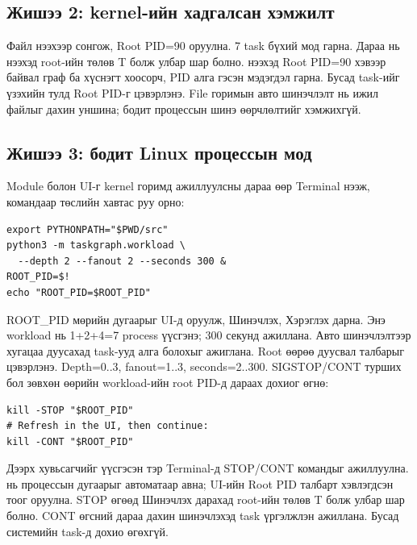 \subsection{Жишээ 2: kernel-ийн хадгалсан хэмжилт}
Файл нээхээр  сонгож, Root PID=90 оруулна. 7 task бүхий мод гарна. Дараа нь  нээхэд root-ийн төлөв T болж улбар шар болно.  нээхэд Root PID=90 хэвээр байвал граф ба хүснэгт хоосорч, PID алга гэсэн мэдэгдэл гарна. Бусад task-ийг үзэхийн тулд Root PID-г цэвэрлэнэ.
File горимын авто шинэчлэлт нь ижил файлыг дахин уншина; бодит процессын шинэ өөрчлөлтийг хэмжихгүй.

\clearpage
\subsection{Жишээ 3: бодит Linux процессын мод}
Module болон UI-г kernel горимд ажиллуулсны дараа өөр Terminal нээж,  командаар төслийн хавтас руу орно:
\begin{lstlisting}
export PYTHONPATH="$PWD/src"
python3 -m taskgraph.workload \
  --depth 2 --fanout 2 --seconds 300 &
ROOT_PID=$!
echo "ROOT_PID=$ROOT_PID"
\end{lstlisting}
ROOT\_PID мөрийн дугаарыг UI-д оруулж, Шинэчлэх, Хэрэглэх дарна. Энэ workload нь 1+2+4=7 process үүсгэнэ; 300 секунд ажиллана. Авто шинэчлэлтээр хугацаа дуусахад task-ууд алга болохыг ажиглана. Root өөрөө дуусвал талбарыг цэвэрлэнэ.
Depth=0..3, fanout=1..3, seconds=2..300. SIGSTOP/CONT турших бол зөвхөн өөрийн workload-ийн root PID-д дараах дохиог өгнө:
\begin{lstlisting}
kill -STOP "$ROOT_PID"
# Refresh in the UI, then continue:
kill -CONT "$ROOT_PID"
\end{lstlisting}

Дээрх хувьсагчийг үүсгэсэн тэр Terminal-д STOP/CONT командыг ажиллуулна.  нь процессын дугаарыг автоматаар авна; UI-ийн Root PID талбарт хэвлэгдсэн тоог оруулна. STOP өгөөд Шинэчлэх дарахад root-ийн төлөв T болж улбар шар болно. CONT өгсний дараа дахин шинэчлэхэд task үргэлжлэн ажиллана. Бусад системийн task-д дохио өгөхгүй.

